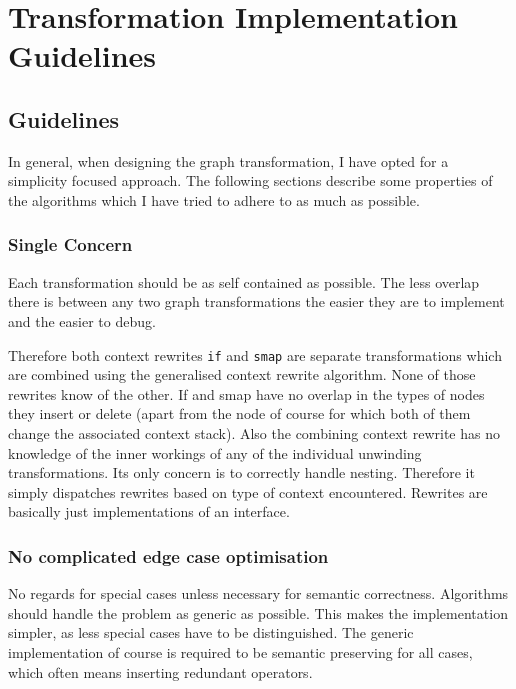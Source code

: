 \chapter{Transformation Implementation Guidelines}
\label{ch:trans-implementation}


\section{Guidelines}

In general, when designing the \yauhau{} graph transformation, I have opted for a simplicity focused approach.
The following sections describe some properties of the algorithms which I have tried to adhere to as much as possible.

\subsection{Single Concern}

Each transformation should be as self contained as possible.
The less overlap there is between any two graph transformations the easier they are to implement and the easier to debug.

Therefore both context rewrites \texttt{if} and \texttt{smap} are separate transformations which are combined using the generalised context rewrite algorithm.
None of those rewrites know of the other.
If and smap have no overlap in the types of nodes they insert or delete (apart from the \fetch{} node of course for which both of them change the associated context stack).
Also the combining context rewrite has no knowledge of the inner workings of any of the individual unwinding transformations.
Its only concern is to correctly handle nesting.
Therefore it simply dispatches rewrites based on type of context encountered.
Rewrites are basically just implementations of an interface.

\subsection{No complicated edge case optimisation}

No regards for special cases unless necessary for semantic correctness.
Algorithms should handle the problem as generic as possible.
This makes the implementation simpler, as less special cases have to be distinguished.
The generic implementation of course is required to be semantic preserving for all cases, which often means inserting redundant operators.

